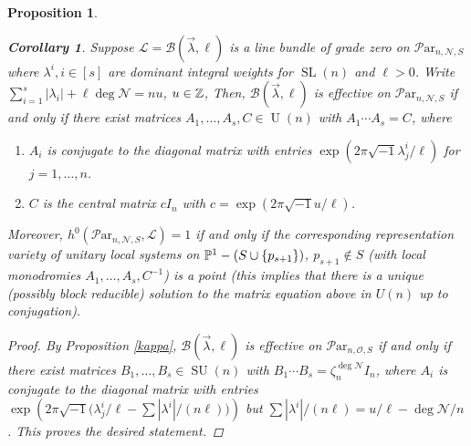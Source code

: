 \documentclass[11pt]{amsart}
\newcommand\op{\operatorname}
\newcommand\ml{\mathcal{L}}
\newcommand\mn{\mathcal{N}}
\newcommand\Par{\mathcal{P}\text{ar} }
\newtheorem{corollary}[theorem]{Corollary}
\newtheorem{proposition}[theorem]{Proposition}
\numberwithin{theorem}{subsection}
\begin{document}
{\begin{proposition}
\begin{corollary}\label{sansD}
Suppose  $\ml=\mathcal{B}(\vec{\lambda},\ell)$ is a line bundle of grade zero on  $\Par_{n,\mn,S}$ where $\lambda^i, i\in[s]$ are dominant integral weights for $\op{SL}(n)$ and $\ell>0$. Write  $\sum_{i=1}^s|\lambda_i|+ \ell \deg\mn=nu$, $u\in \Bbb{Z}$, Then, $\mathcal{B}(\vec{\lambda},\ell)$
is effective on   $\Par_{n,\mn,S}$  if and only if there exist matrices $A_1,\dots,A_s,C\in \op{U}(n)$ with $A_1\cdots A_s=C$, where
\begin{enumerate}
\item $A_i$ is conjugate to the diagonal matrix with entries $\exp(2\pi\sqrt{-1}\lambda^i_j/\ell)$ for $j=1,\dots,n$.
\item $C$ is the central matrix $c I_n$ with $c=\exp(2\pi\sqrt{-1}u/\ell)$.
\end{enumerate}
Moreover,  $h^0(\Par_{n,\mn,S},\ml)=1$ if and only if the corresponding representation variety of unitary local systems  on $\Bbb{P}^1-(S\cup\{p_{s+1}\})$, $p_{s+1}\not\in S$ (with local monodromies $A_1,\dots,A_s, C^{-1}$) is a point (this implies that there is a unique (possibly block reducible) solution to the matrix equation above in $U(n)$ up to conjugation).
\end{corollary}
\begin{proof}
By Proposition \ref{kappa}, $\mathcal{B}(\vec{\lambda},\ell)$
is effective on   $\Par_{n,\mathcal{O},S}$  if and only if there exist matrices $B_1,\dots,B_s\in \op{SU}(n)$ with $B_1\cdots B_s=\zeta_n^{\deg \mn}I_n$, where $A_i$ is conjugate to the diagonal matrix with entries $\exp(2\pi\sqrt{-1}\bigl(\lambda^i_j/{\ell}-\sum |\lambda^i|/(n\ell)\bigr))$ but
$\sum |\lambda^i|/(n\ell)=u/\ell - \deg\mn/n$. This proves the desired statement.

\end{proof}



\end{proposition}}
\end{document}
